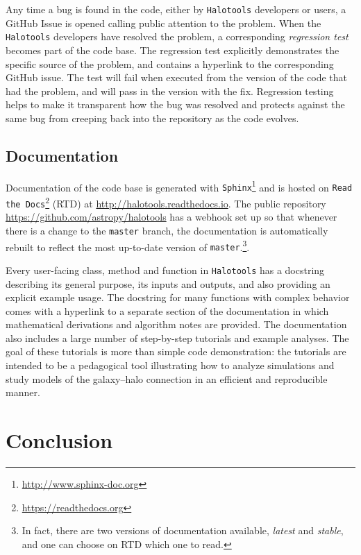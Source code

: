 \documentclass[twocolumn, tighten]{aastex6}
\begin{document}
Any time a bug is found in the code, either by {\tt Halotools} developers or users, a GitHub Issue is opened calling public attention to the problem. When the {\tt Halotools} developers have resolved the problem, a corresponding {\em regression test} becomes part of the code base. The regression test explicitly demonstrates the specific source of the problem, and contains a hyperlink to the corresponding GitHub issue. The test will fail when executed from the version of the code that had the problem, and will pass in the version with the fix. Regression testing helps to make it transparent how the bug was resolved and protects against the same bug from creeping back into the repository as the code evolves.

\subsection{Documentation}
\label{subsection:documentation}

Documentation of the code base is generated with {\tt Sphinx}\footnote{\url{http://www.sphinx-doc.org}} and is hosted on {\tt Read the Docs}\footnote{\url{ https://readthedocs.org}} (RTD) at \url{http://halotools.readthedocs.io}. The public repository \url{https://github.com/astropy/halotools} has a webhook set up so that whenever there is a change to the {\tt master} branch, the documentation is automatically rebuilt to reflect the most up-to-date version of {\tt master}.\footnote{In fact, there are two versions of documentation available, {\em latest} and {\em stable}, and one can choose on RTD which one to read.}. 

Every user-facing class, method and function in {\tt Halotools} has a docstring describing its general purpose, its inputs and outputs, and also providing an explicit example usage. The docstring for many functions with complex behavior comes with a hyperlink to a separate section of the documentation in which mathematical derivations and algorithm notes are provided. The documentation also includes a large number of step-by-step tutorials and example analyses. The goal of these tutorials is more than simple code demonstration: the tutorials are intended to be a pedagogical tool illustrating how to analyze simulations and study models of the galaxy--halo connection in an efficient and reproducible manner.

\section{Conclusion}
\label{section:conclusion}
\end{document}
